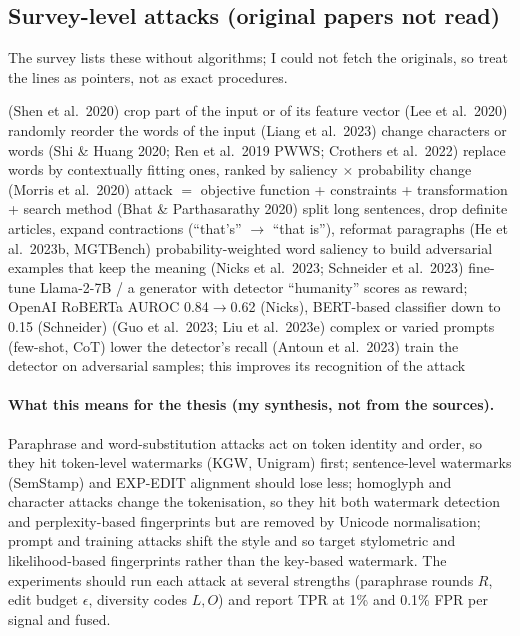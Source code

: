 \documentclass[10pt,a4paper,twocolumn]{article}
\begin{document}
\subsection*{Survey-level attacks (original papers not read)}
The survey lists these without algorithms; I could not fetch the originals, so treat the lines as pointers, not as exact procedures.
\begin{algorithm}[H]\small
\caption{Attacks only described in Wu et al.\ Sec.~8.2}
\begin{algorithmic}[1]
 (Shen et al.\ 2020) \State crop part of the input or of its feature vector \EndProcedure
{} (Lee et al.\ 2020) \State randomly reorder the words of the input \EndProcedure
{} (Liang et al.\ 2023) \State change characters or words \EndProcedure
{} (Shi \& Huang 2020; Ren et al.\ 2019 PWWS; Crothers et al.\ 2022) \State replace words by contextually fitting ones, ranked by saliency $\times$ probability change  \EndProcedure
{} (Morris et al.\ 2020) \State attack $=$ objective function + constraints + transformation + search method \EndProcedure
{} (Bhat \& Parthasarathy 2020) \State split long sentences, drop definite articles, expand contractions (``that's'' $\to$ ``that is''), reformat paragraphs \EndProcedure
{} (He et al.\ 2023b, MGTBench) \State probability-weighted word saliency to build adversarial examples that keep the meaning \EndProcedure
{} (Nicks et al.\ 2023; Schneider et al.\ 2023) \State fine-tune Llama-2-7B / a generator with detector ``humanity'' scores as reward; OpenAI RoBERTa AUROC 0.84$\to$0.62 (Nicks), BERT-based classifier down to 0.15 (Schneider) \EndProcedure
{} (Guo et al.\ 2023; Liu et al.\ 2023e) \State complex or varied prompts (few-shot, CoT) lower the detector's recall \EndProcedure
{} (Antoun et al.\ 2023) \State train the detector on adversarial samples; this improves its recognition of the attack \EndProcedure
\end{algorithmic}
\end{algorithm}

\paragraph{What this means for the thesis (my synthesis, not from the sources).} Paraphrase and word-substitution attacks act on token identity and order, so they hit token-level watermarks (KGW, Unigram) first; sentence-level watermarks (SemStamp) and EXP-EDIT alignment should lose less; homoglyph and character attacks change the tokenisation, so they hit both watermark detection and perplexity-based fingerprints but are removed by Unicode normalisation; prompt and training attacks shift the style and so target stylometric and likelihood-based fingerprints rather than the key-based watermark. The experiments should run each attack at several strengths (paraphrase rounds $R$, edit budget $\epsilon$, diversity codes $L,O$) and report TPR at 1\% and 0.1\% FPR per signal and fused.
\end{document}
